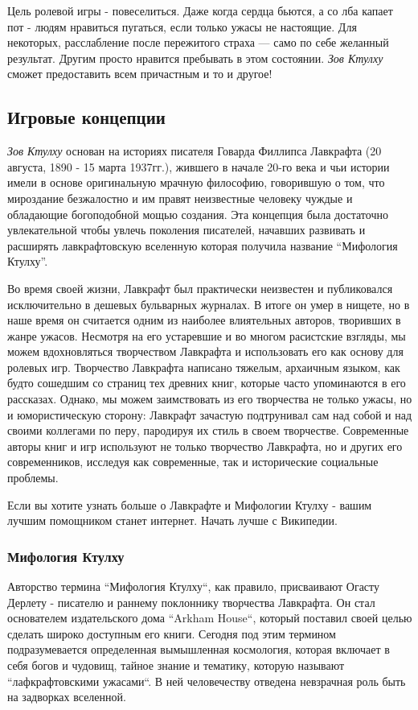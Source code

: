 \documentclass[letterpaper,twocolumn,openany, twoside, 11pt, usenames]{cocbook}
\begin{document}
Цель ролевой игры - повеселиться. Даже когда сердца бьются, а со лба капает пот - людям нравиться пугаться, если только ужасы не настоящие. Для некоторых, расслабление после пережитого страха --- само по себе желанный результат. Другим просто нравится пребывать в этом состоянии. {\it Зов Ктулху} сможет предоставить всем причастным и то и другое!

\subsection*{\nohyphens{Игровые концепции}}

{\it Зов Ктулху} основан на историях писателя Говарда Филлипса Лавкрафта (20 августа, 1890 - 15 марта 1937гг.), жившего в начале 20-го века и чьи истории имели в основе оригинальную мрачную философию, говорившую о том, что мироздание безжалостно и им правят неизвестные человеку чуждые и обладающие богоподобной мощью создания. Эта концепция была достаточно увлекательной чтобы увлечь поколения писателей, начавших развивать и расширять лавкрафтовскую вселенную которая получила название ``Мифология Ктулху''.

Во время своей жизни, Лавкрафт был практически неизвестен и публиковался исключительно в дешевых бульварных журналах. В итоге он умер в нищете, но в наше время он считается одним из наиболее влиятельных авторов, творивших в жанре ужасов. Несмотря на его устаревшие и во многом расистские взгляды, мы можем вдохновляться творчеством Лавкрафта и использовать его как основу для ролевых игр. Творчество Лавкрафта написано тяжелым, архаичным языком, как будто сошедшим со страниц тех древних книг, которые часто упоминаются в его рассказах. Однако, мы можем заимствовать из его творчества не только ужасы, но и юмористическую сторону: Лавкрафт зачастую подтрунивал сам над собой и над своими коллегами по перу, пародируя их стиль в своем творчестве. Современные авторы книг и игр используют не только творчество Лавкрафта, но и других его современников, исследуя как современные, так и исторические социальные проблемы.

Если вы хотите узнать больше о Лавкрафте и Мифологии Ктулху - вашим лучшим помощником станет интернет. Начать лучше с Википедии.

\subsubsection*{\nohyphens{Мифология Ктулху}}

Авторство термина ``Мифология Ктулху``, как правило, присваивают Огасту Дерлету - писателю и раннему поклоннику творчества Лавкрафта. Он стал основателем издательского дома ``Arkham House``, который поставил своей целью сделать широко доступным его книги. Сегодня под этим термином подразумевается определенная вымышленная космология, которая включает в себя богов и чудовищ, тайное знание и тематику, которую называют ``лафкрафтовскими ужасами``. В ней человечеству отведена невзрачная роль быть на задворках вселенной.
\end{document}
